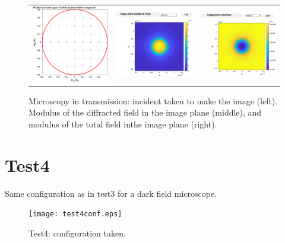 \begin{figure}[H]
\begin{center}
\begin{tabular}{ccc}
 \includegraphics*[width=5.0cm,draft=false]{test3angleincbf.eps}
&  \includegraphics*[width=5.0cm,draft=false]{test3imagewf.eps}
& \includegraphics*[width=5.0cm,draft=false]{test3imageincwf.eps}
\end{tabular}

\end{center}
\caption{Microscopy in transmission: incident taken to make the image
  (left). Modulus of the diffracted field in the image plane (middle),
  and modulus of the total field inthe image plane (right).}
\end{figure}


\section{Test4}

Same configuration as in test3 for a dark field microscope.


\begin{figure}[H]
\begin{center}
  \texttt{[image: test4conf.eps]}
\end{center}
\caption{Test4: configuration taken.}
\label{test4conf}
\end{figure}


